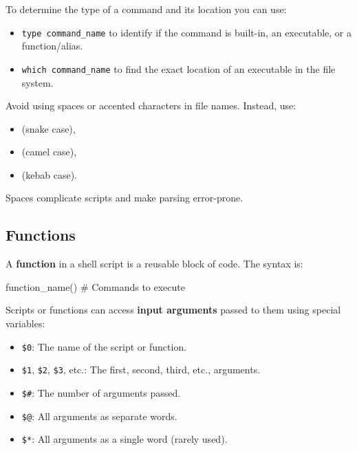To determine the type of a command and its location you can use:
\begin{itemize}
    \item \texttt{type command\_name} to identify if the command is built-in, an executable, or a function/alias.
    \item \texttt{which command\_name} to find the exact location of an executable in the file system.
\end{itemize}

\begin{warningblock}
    Avoid using spaces or accented characters in file names. Instead, use:
    \begin{itemize}
        \item {} (snake case),
        \item {} (camel case),
        \item {} (kebab case).
    \end{itemize}
    Spaces complicate scripts and make parsing error-prone.
\end{warningblock}

\newpage

\subsection{Functions}

A \textbf{function} in a shell script is a reusable block of code. The syntax is:
\begin{codeblock}[language=bash]
function_name() {
    # Commands to execute
}
\end{codeblock}

\vspace{-0.3em}

Scripts or functions can access \textbf{input arguments} passed to them using special variables:
\begin{itemize}
    \item \texttt{\$0}: The name of the script or function.
    \item \texttt{\$1}, \texttt{\$2}, \texttt{\$3}, etc.: The first, second, third, etc., arguments.
    \item \texttt{\$\#}: The number of arguments passed.
    \item \texttt{\$@}: All arguments as separate words.
    \item \texttt{\$*}: All arguments as a single word (rarely used).
\end{itemize}

